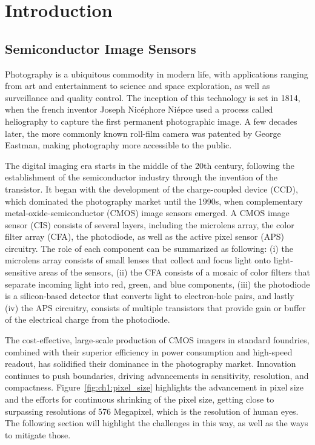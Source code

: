 \chapter{Introduction}\label{ch:introduction}

\section{Semiconductor Image Sensors}

Photography is a ubiquitous commodity in modern life, with applications ranging from art and entertainment to science and space exploration, as well as surveillance and quality control. The inception of this technology is set in 1814, when the french inventor Joseph Nicéphore Niépce used a process called heliography to capture the first permanent photographic image. A few decades later, the more commonly known roll-film camera was patented by George Eastman, making photography more accessible to the public.

The digital imaging era starts in the middle of the 20th century, following the establishment of the semiconductor industry through the invention of the transistor. It began with the development of the charge-coupled device (CCD), which dominated the photography market until the 1990s, when complementary metal-oxide-semiconductor (CMOS) image sensors emerged. A CMOS image sensor (CIS) consists of several layers, including the microlens array, the color filter array (CFA), the photodiode, as well as the active pixel sensor (APS) circuitry. The role of each component can be summarized as following: (i) the microlens array consists of small lenses that collect and focus light onto light-sensitive areas of the sensors, (ii) the CFA consists of a mosaic of color filters that separate incoming light into red, green, and blue components, (iii) the photodiode is a silicon-based detector that converts light to electron-hole pairs, and lastly (iv) the APS circuitry, consists of multiple transistors that provide gain or buffer of the electrical charge from the photodiode.


The cost-effective, large-scale production of CMOS imagers in standard foundries, combined with their superior efficiency in power consumption and high-speed readout, has solidified their dominance in the photography market. Innovation continues to push boundaries, driving advancements in sensitivity, resolution, and compactness. Figure~\ref{fig:ch1:pixel_size} highlights the advancement in pixel size and the efforts for continuous shrinking of the pixel size, getting close to surpassing resolutions of 576 Megapixel, which is the resolution of human eyes. The following section will highlight the challenges in this way, as well as the ways to mitigate those. 


